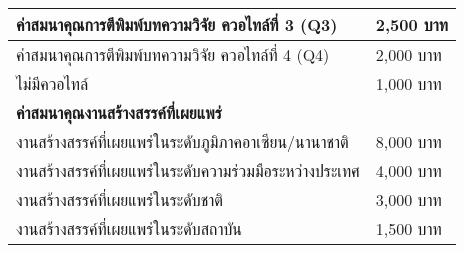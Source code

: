 \begin{center}
\begin{longtable}{|p{}|p{}|}
			\hline
			ค่าสมนาคุณการตีพิมพ์บทความวิจัย ควอไทล์ที่ 3 (Q3)         	&2,500 บาท\\
			\hline
			ค่าสมนาคุณการตีพิมพ์บทความวิจัย ควอไทล์ที่ 4 (Q4)         	&2,000 บาท\\
			\hline
			ไม่มีควอไทล์	&1,000 บาท\\
			\hline
			\multicolumn{2}{|l|}{\textbf{ค่าสมนาคุณงานสร้างสรรค์ที่เผยแพร่}}\\
			\hline
			งานสร้างสรรค์ที่เผยแพร่ในระดับภูมิภาคอาเซียน/นานาชาติ     	&8,000 บาท\\
			\hline
			งานสร้างสรรค์ที่เผยแพร่ในระดับความร่วมมือระหว่างประเทศ  	&4,000 บาท\\
			\hline
			งานสร้างสรรค์ที่เผยแพร่ในระดับชาติ                                	&3,000 บาท\\
			\hline
			งานสร้างสรรค์ที่เผยแพร่ในระดับสถาบัน                            	&1,500 บาท\\
			\hline
	\end{longtable}
\end{center}
\begin{doclist}
\end{doclist}
